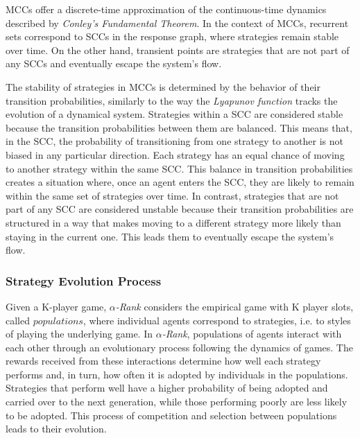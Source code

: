         \noindent
        MCCs offer a discrete-time approximation of the continuous-time dynamics described by \emph{Conley’s Fundamental Theorem}. In the context of MCCs, recurrent sets correspond to SCCs in the response graph, where strategies remain stable over time. On the other hand, transient points are strategies that are not part of any SCCs and eventually escape the system's flow.\tinydouble
        
        \noindent
        The stability of strategies in MCCs is determined by the behavior of their transition probabilities, similarly to the way the \emph{Lyapunov function} tracks the evolution of a dynamical system. Strategies within a SCC are considered stable because the transition probabilities between them are balanced. This means that, in the SCC, the probability of transitioning from one strategy to another is not biased in any particular direction. Each strategy has an equal chance of moving to another strategy within the same SCC. This balance in transition probabilities creates a situation where, once an agent enters the SCC, they are likely to remain within the same set of strategies over time. In contrast, strategies that are not part of any SCC are considered unstable because their transition probabilities are structured in a way that makes moving to a different strategy more likely than staying in the current one. This leads them to eventually escape the system's flow.

    \subsubsection{Strategy Evolution Process}

        Given a K-player game, \emph{$\alpha$-Rank} considers the empirical game with K player slots, called $populations$, where individual agents correspond to strategies, i.e. to styles of playing the underlying game. In \emph{$\alpha$-Rank}, populations of agents interact with each other through an evolutionary process following the dynamics of games. The rewards received from these interactions determine how well each strategy performs and, in turn, how often it is adopted by individuals in the populations. Strategies that perform well have a higher probability of being adopted and carried over to the next generation, while those performing poorly are less likely to be adopted. This process of competition and selection between populations leads to their evolution.\tinydouble

